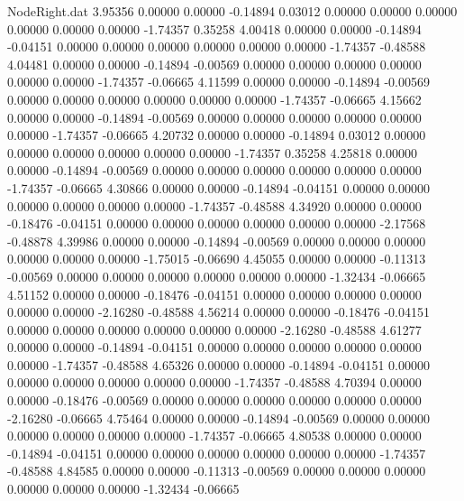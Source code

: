 \begin{filecontents}{NodeRight.dat}
   3.95356    0.00000    0.00000    -0.14894    0.03012    0.00000    0.00000    0.00000    0.00000    0.00000    0.00000   -1.74357    0.35258
   4.00418    0.00000    0.00000    -0.14894   -0.04151    0.00000    0.00000    0.00000    0.00000    0.00000    0.00000   -1.74357   -0.48588
   4.04481    0.00000    0.00000    -0.14894   -0.00569    0.00000    0.00000    0.00000    0.00000    0.00000    0.00000   -1.74357   -0.06665
   4.11599    0.00000    0.00000    -0.14894   -0.00569    0.00000    0.00000    0.00000    0.00000    0.00000    0.00000   -1.74357   -0.06665
   4.15662    0.00000    0.00000    -0.14894   -0.00569    0.00000    0.00000    0.00000    0.00000    0.00000    0.00000   -1.74357   -0.06665
   4.20732    0.00000    0.00000    -0.14894    0.03012    0.00000    0.00000    0.00000    0.00000    0.00000    0.00000   -1.74357    0.35258
   4.25818    0.00000    0.00000    -0.14894   -0.00569    0.00000    0.00000    0.00000    0.00000    0.00000    0.00000   -1.74357   -0.06665
   4.30866    0.00000    0.00000    -0.14894   -0.04151    0.00000    0.00000    0.00000    0.00000    0.00000    0.00000   -1.74357   -0.48588
   4.34920    0.00000    0.00000    -0.18476   -0.04151    0.00000    0.00000    0.00000    0.00000    0.00000    0.00000   -2.17568   -0.48878
   4.39986    0.00000    0.00000    -0.14894   -0.00569    0.00000    0.00000    0.00000    0.00000    0.00000    0.00000   -1.75015   -0.06690
   4.45055    0.00000    0.00000    -0.11313   -0.00569    0.00000    0.00000    0.00000    0.00000    0.00000    0.00000   -1.32434   -0.06665
   4.51152    0.00000    0.00000    -0.18476   -0.04151    0.00000    0.00000    0.00000    0.00000    0.00000    0.00000   -2.16280   -0.48588
   4.56214    0.00000    0.00000    -0.18476   -0.04151    0.00000    0.00000    0.00000    0.00000    0.00000    0.00000   -2.16280   -0.48588
   4.61277    0.00000    0.00000    -0.14894   -0.04151    0.00000    0.00000    0.00000    0.00000    0.00000    0.00000   -1.74357   -0.48588
   4.65326    0.00000    0.00000    -0.14894   -0.04151    0.00000    0.00000    0.00000    0.00000    0.00000    0.00000   -1.74357   -0.48588
   4.70394    0.00000    0.00000    -0.18476   -0.00569    0.00000    0.00000    0.00000    0.00000    0.00000    0.00000   -2.16280   -0.06665
   4.75464    0.00000    0.00000    -0.14894   -0.00569    0.00000    0.00000    0.00000    0.00000    0.00000    0.00000   -1.74357   -0.06665
   4.80538    0.00000    0.00000    -0.14894   -0.04151    0.00000    0.00000    0.00000    0.00000    0.00000    0.00000   -1.74357   -0.48588
   4.84585    0.00000    0.00000    -0.11313   -0.00569    0.00000    0.00000    0.00000    0.00000    0.00000    0.00000   -1.32434   -0.06665

\end{filecontents}
